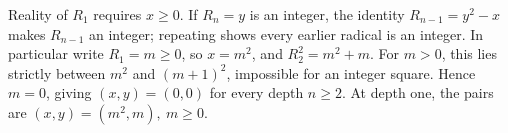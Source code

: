 Reality of $R_1$ requires $x\ge0$. If $R_n=y$ is an integer, the identity $R_{n-1}=y^2-x$ makes $R_{n-1}$ an integer; repeating shows every earlier radical is an integer. In particular write $R_1=m\ge0$, so $x=m^2$, and $R_2^2=m^2+m$. For $m>0$, this lies strictly between $m^2$ and $(m+1)^2$, impossible for an integer square. Hence $m=0$, giving $\boxed{(x,y)=(0,0)}$ for every depth $n\ge2$. At depth one, the pairs are $\boxed{(x,y)=(m^2,m),\ m\ge0}$.
